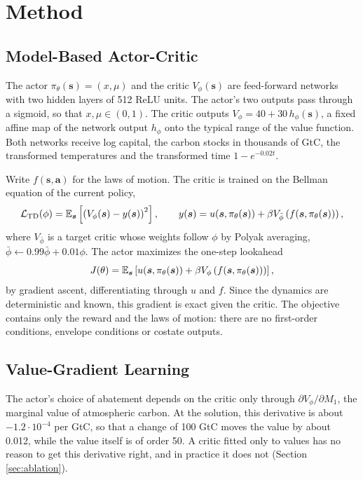 \section{Method}
\label{sec:method}

\subsection{Model-Based Actor-Critic}

The actor \(\pi_\theta(\bm{s}) = (x, \mu)\) and the critic \(V_\phi(\bm{s})\) are feed-forward networks with two hidden layers of 512 ReLU units. The actor's two outputs pass through a sigmoid, so that \(x, \mu \in (0, 1)\). The critic outputs \(V_\phi = 40 + 30\, h_\phi(\bm{s})\), a fixed affine map of the network output \(h_\phi\) onto the typical range of the value function. Both networks receive log capital, the carbon stocks in thousands of GtC, the transformed temperatures and the transformed time \(1 - e^{-0.02t}\).

Write \(f(\bm{s}, \bm{a})\) for the laws of motion. The critic is trained on the Bellman equation of the current policy,
\begin{equation}
    \mathcal{L}_{\text{TD}}(\phi) = \mathbb{E}_{\bm{s}}\left[\left(V_\phi(\bm{s}) - y(\bm{s})\right)^2\right], \qquad
    y(\bm{s}) = u(\bm{s}, \pi_\theta(\bm{s})) + \beta V_{\bar\phi}\left(f(\bm{s}, \pi_\theta(\bm{s}))\right),
\end{equation}
where \(V_{\bar\phi}\) is a target critic whose weights follow \(\phi\) by Polyak averaging, \(\bar\phi \leftarrow 0.99\bar\phi + 0.01\phi\). The actor maximizes the one-step lookahead
\begin{equation}
    J(\theta) = \mathbb{E}_{\bm{s}}\left[u(\bm{s}, \pi_\theta(\bm{s})) + \beta V_\phi\left(f(\bm{s}, \pi_\theta(\bm{s}))\right)\right],
\end{equation}
by gradient ascent, differentiating through \(u\) and \(f\). Since the dynamics are deterministic and known, this gradient is exact given the critic. The objective contains only the reward and the laws of motion: there are no first-order conditions, envelope conditions or costate outputs.

\subsection{Value-Gradient Learning}

The actor's choice of abatement depends on the critic only through \(\partial V_\phi / \partial M_1\), the marginal value of atmospheric carbon. At the solution, this derivative is about \(-1.2 \cdot 10^{-4}\) per GtC, so that a change of 100 GtC moves the value by about 0.012, while the value itself is of order 50. A critic fitted only to values has no reason to get this derivative right, and in practice it does not (Section \ref{sec:ablation}).

